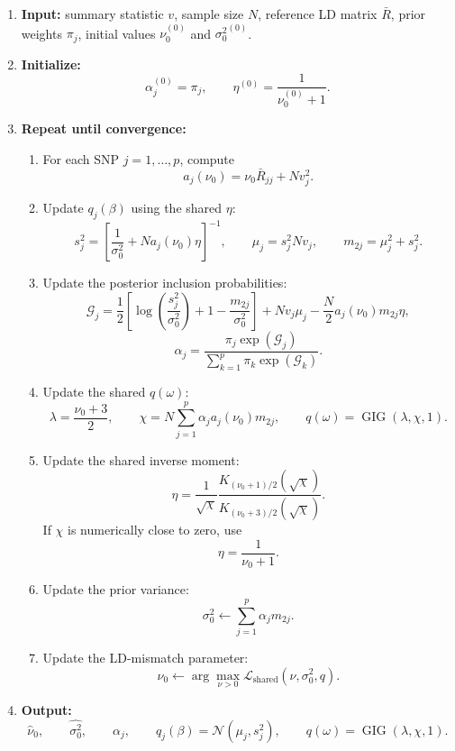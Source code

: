 \documentclass[11pt]{article}
\newcommand{\Rbar}{\bar R}
\newcommand{\nuo}{\nu_0}
\newcommand{\sigb}{\sigma_0^2}
\newcommand{\Normal}{\mathcal N}
\newcommand{\GIG}{\operatorname{GIG}}
\begin{document}
\begin{enumerate}[leftmargin=2em]

\item \textbf{Input:}
summary statistic \(v\), sample size \(N\), reference LD matrix \(\Rbar\), prior weights \(\pi_j\), initial values \(\nuo^{(0)}\) and \({\sigb}^{(0)}\).

\item \textbf{Initialize:}
\[
\alpha_j^{(0)}=\pi_j,
\qquad
\eta^{(0)}=\frac{1}{\nuo^{(0)}+1}.
\]

\item \textbf{Repeat until convergence:}

\begin{enumerate}[leftmargin=2em]

\item For each SNP \(j=1,\dots,p\), compute
\[
a_j(\nuo)=\nuo\Rbar_{jj}+Nv_j^2.
\]

\item Update \(q_j(\beta)\) using the shared \(\eta\):
\[
s_j^2
=
\left[
\frac{1}{\sigb}
+
N a_j(\nuo)\eta
\right]^{-1},
\qquad
\mu_j=s_j^2Nv_j,
\qquad
m_{2j}=\mu_j^2+s_j^2.
\]

\item Update the posterior inclusion probabilities:
\[
\mathcal G_j
=
\frac12
\left[
\log\left(\frac{s_j^2}{\sigb}\right)
+
1
-
\frac{m_{2j}}{\sigb}
\right]
+
Nv_j\mu_j
-
\frac N2a_j(\nuo)m_{2j}\eta,
\]
\[
\alpha_j
=
\frac{
\pi_j\exp(\mathcal G_j)
}{
\sum_{k=1}^p
\pi_k\exp(\mathcal G_k)
}.
\]

\item Update the shared \(q(\omega)\):
\[
\lambda=\frac{\nuo+3}{2},
\qquad
\chi
=
N
\sum_{j=1}^p
\alpha_j a_j(\nuo)m_{2j},
\qquad
q(\omega)=\GIG(\lambda,\chi,1).
\]

\item Update the shared inverse moment:
\[
\eta
=
\frac{1}{\sqrt{\chi}}
\frac{
K_{(\nuo+1)/2}(\sqrt{\chi})
}{
K_{(\nuo+3)/2}(\sqrt{\chi})
}.
\]
If \(\chi\) is numerically close to zero, use
\[
\eta=\frac{1}{\nuo+1}.
\]

\item Update the prior variance:
\[
\sigb
\leftarrow
\sum_{j=1}^p
\alpha_j m_{2j}.
\]

\item Update the LD-mismatch parameter:
\[
\nuo
\leftarrow
\arg\max_{\nu>0}
\mathcal L_{\mathrm{shared}}(\nu,\sigb,q).
\]

\end{enumerate}

\item \textbf{Output:}
\[
\widehat\nuo,
\qquad
\widehat{\sigb},
\qquad
\alpha_j,
\qquad
q_j(\beta)=\Normal(\mu_j,s_j^2),
\qquad
q(\omega)=\GIG(\lambda,\chi,1).
\]

\end{enumerate}
\end{document}
